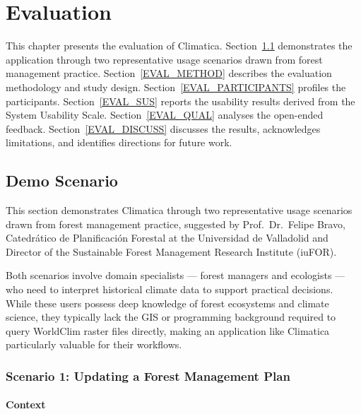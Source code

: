 \chapter{Evaluation}\label{EVAL}

This chapter presents the evaluation of Climatica.
Section~\ref{EVAL_DEMO} demonstrates the application through two representative
usage scenarios drawn from forest management practice.
Section~\ref{EVAL_METHOD} describes the evaluation methodology and study design.
Section~\ref{EVAL_PARTICIPANTS} profiles the participants.
Section~\ref{EVAL_SUS} reports the usability results derived from the System
Usability Scale.
Section~\ref{EVAL_QUAL} analyses the open-ended feedback.
Section~\ref{EVAL_DISCUSS} discusses the results, acknowledges limitations,
and identifies directions for future work.

\section{Demo Scenario}\label{EVAL_DEMO}

This section demonstrates Climatica through two representative usage scenarios
drawn from forest management practice, suggested by Prof.\ Dr.\ Felipe Bravo,
Catedrático de Planificación Forestal at the Universidad de Valladolid and
Director of the Sustainable Forest Management Research Institute (iuFOR).

Both scenarios involve domain specialists --- forest managers and ecologists
--- who need to interpret historical climate data to support practical
decisions. While these users possess deep knowledge of forest ecosystems and
climate science, they typically lack the GIS or programming background
required to query WorldClim raster files directly, making an application like
Climatica particularly valuable for their workflows.

\subsection{Scenario 1: Updating a Forest Management Plan}\label{EVAL_DEMO_FMP}

\subsubsection{Context}

